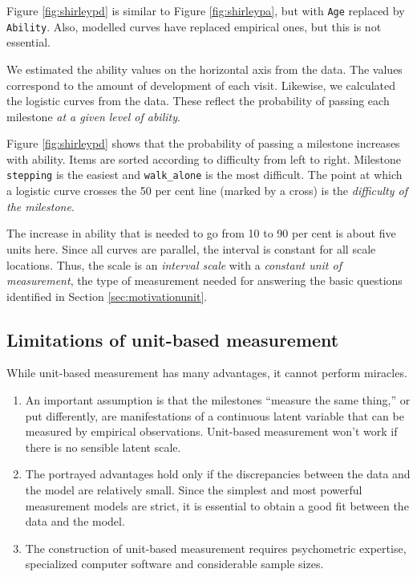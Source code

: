 \documentclass[
]{book}
\begin{document}
Figure \ref{fig:shirleypd} is similar to Figure \ref{fig:shirleypa}, but with \texttt{Age} replaced by \texttt{Ability}. Also, modelled curves have replaced empirical ones, but this is not essential.

We estimated the ability values on the horizontal axis from the data. The values correspond to the amount of development of each visit. Likewise, we calculated the logistic curves from the data. These reflect the probability of passing each milestone \emph{at a given level of ability}.

Figure \ref{fig:shirleypd} shows that the probability of passing a milestone increases with ability. Items are sorted according to difficulty from left to right. Milestone \texttt{stepping} is the easiest and \texttt{walk\_alone} is the most difficult. The point at which a logistic curve crosses the 50 per cent line (marked by a cross) is the \emph{difficulty of the milestone}.

The increase in ability that is needed to go from 10 to 90 per cent is about five units here. Since all curves are parallel, the interval is constant for all scale locations. Thus, the scale is an \emph{interval scale} with a \emph{constant unit of measurement}, the type of measurement needed for answering the basic questions identified in Section \ref{sec:motivationunit}.

\hypertarget{limitations-of-unit-based-measurement}{%
\subsection{Limitations of unit-based measurement}\label{limitations-of-unit-based-measurement}}

While unit-based measurement has many advantages, it cannot perform miracles.

\begin{enumerate}
\def\labelenumi{\arabic{enumi}.}
\item
  An important assumption is that the milestones ``measure the same thing,'' or put differently, are manifestations of a continuous latent variable that can be measured by empirical observations. Unit-based measurement won't work if there is no sensible latent scale.
\item
  The portrayed advantages hold only if the discrepancies between the data and the model are relatively small. Since the simplest and most powerful measurement models are strict, it is essential to obtain a good fit between the data and the model.
\item
  The construction of unit-based measurement requires psychometric expertise, specialized computer software and considerable sample sizes.
\end{enumerate}
\end{document}
